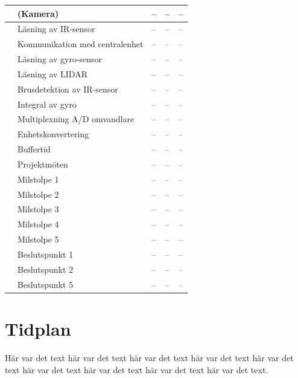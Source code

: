 \documentclass[a4paper,titlepage,12pt]{article}
\newcounter{aktNr}
\newcommand{\nextAktNr}{\stepcounter{aktNr}\arabic{aktNr}}
\begin{document}
\begin{longtable}[c]{ c l l l l}
		\nextAktNr{} & (Kamera) & -- & -- & -- \\ \midrule
		\nextAktNr{} & Läsning av IR-sensor & -- & -- & -- \\ \midrule
		\nextAktNr{} & Kommunikation med centralenhet & -- & -- & -- \\ \midrule
		\nextAktNr{} & Läsning av gyro-sensor & -- & -- & -- \\ \midrule
		\nextAktNr{} & Läsning av LIDAR & -- & -- & -- \\ \midrule
		\nextAktNr{} & Brusdetektion av IR-sensor & -- & -- & -- \\ \midrule
		\nextAktNr{} & Integral av gyro & -- & -- & -- \\ \midrule
		\nextAktNr{} & Multiplexning A/D omvandlare & -- & -- & -- \\ \midrule
		\nextAktNr{} & Enhetskonvertering & -- & -- & -- \\ \midrule
		\nextAktNr{} & Buffertid & -- & -- & -- \\ \midrule
		\nextAktNr{} & Projektmöten & -- & -- & -- \\ \midrule
		\nextAktNr{} & Milstolpe 1 & -- & -- & -- \\ \midrule
		\nextAktNr{} & Milstolpe 2 & -- & -- & -- \\ \midrule
		\nextAktNr{} & Milstolpe 3 & -- & -- & -- \\ \midrule
		\nextAktNr{} & Milstolpe 4 & -- & -- & -- \\ \midrule
		\nextAktNr{} & Milstolpe 5 & -- & -- & -- \\ \midrule
		\nextAktNr{} & Beslutspunkt 1 & -- & -- & -- \\ \midrule
		\nextAktNr{} & Beslutspunkt 2 & -- & -- & -- \\ \midrule
		\nextAktNr{} & Beslutspunkt 5 & -- & -- & -- \\ \midrule
	\end{longtable}

	
	\section{Tidplan}
	Här var det text här var det text här var det text
	här var det text här var det text här var det text
	här var det text här var det text här var det text.
	
	
	
\end{document}
